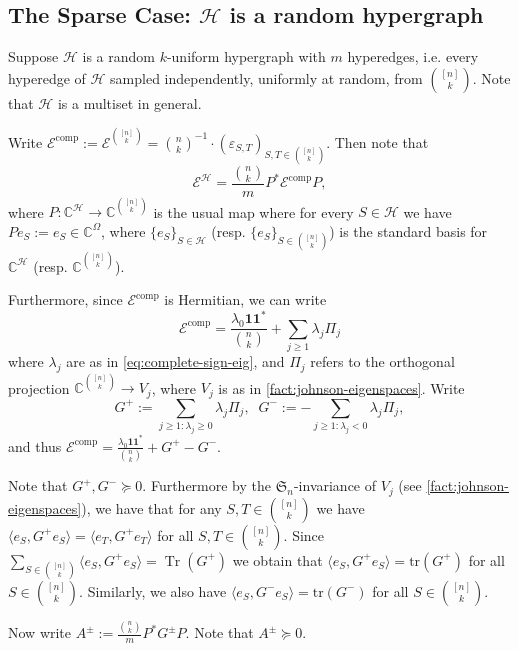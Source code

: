 \documentclass
[11pt,letterpaper]
{article}
\theoremstyle{definition}
\newcommand{\Tr}{\operatorname{Tr}}
\newcommand{\eps}{\varepsilon}
\newcommand{\cE}{{\mathcal E}}
\newcommand{\1}{\mathbf{1}}
\newcommand{\tr}{\mathrm{tr}}
\newcommand{\C}{\mathbb C}
\newcommand{\cH}{\mathcal H}
\renewcommand{\geq}{\geqslant}
\renewcommand{\succeq}{\succcurlyeq}
\newcommand{\comp}{\operatorname{comp}}
\begin{document}
\subsection[The Sparse Case]{The Sparse Case: $\cH$ is a random hypergraph}
Suppose $\cH$ is a random $k$-uniform hypergraph with $m$ hyperedges, i.e. every hyperedge of $\cH$ sampled independently, uniformly at random, from $\binom{[n]}{k}$. Note that $\cH$ is a multiset in general.


Write $\cE^{\comp}:= \cE^{\binom{[n]}{k}} = \binom{n}{k}^{-1}\cdot(\eps_{S, T})_{S, T\in\binom{[n]}{k}}$. Then note that 
\[\cE^\cH = \frac{\binom{n}{k}}{m}P^*\cE^{\comp}P,\]
where $P:\C^\cH\to\C^{\binom{[n]}{k}}$ is the usual map where for every $S\in\cH$ we have $Pe_{S}:= e_{S}\in\C^\Omega$, where $\{e_S\}_{S\in\cH}$ (resp. $\{e_S\}_{S\in\binom{[n]}{k}}$) is the standard basis for $\C^{\cH}$ (resp. $\C^{\binom{[n]}{k}}$).

Furthermore, since $\cE^{\comp}$ is Hermitian, we can write 
\[\cE^{\comp} = \frac{\lambda_0\1\1^*}{\binom{n}{k}} + \sum_{j\geq 1}\lambda_j\Pi_j\]
where $\lambda_j$ are as in \cref{eq:complete-sign-eig}, and $\Pi_j$ refers to the orthogonal projection $\C^{\binom{[n]}{k}}\to V_j$, where $V_j$ is as in \cref{fact:johnson-eigenspaces}. Write 
\[G^+:= \sum_{j\geq 1:\lambda_j\geq 0}\lambda_j\Pi_j,\;\;G^{-}:= -\sum_{j\geq 1:\lambda_j < 0}\lambda_j\Pi_j,\]
and thus $\cE^{\comp} = \frac{\lambda_0\1\1^*}{\binom{n}{k}} + G^+ - G^-$. 

Note that $G^+, G^-\succeq 0$. Furthermore by the $\mathfrak{S}_n$-invariance of $V_j$ (see \cref{fact:johnson-eigenspaces}), we have that for any $S, T\in\binom{[n]}{k}$ we have $\langle e_S, G^+ e_S\rangle = \langle e_T, G^+ e_T\rangle$ for all $S, T\in\binom{[n]}{k}$. Since $\sum_{S\in\binom{[n]}{k}}\langle e_S, G^+ e_S\rangle = \Tr(G^+)$ we obtain that $\langle e_S, G^+ e_S\rangle = \tr(G^+)$ for all $S\in\binom{[n]}{k}$. Similarly, we also have $\langle e_S, G^- e_S\rangle = \tr(G^-)$ for all $S\in\binom{[n]}{k}$.

Now write $A^{\pm}:= \frac{\binom{n}{k}}{m}P^*G^{\pm}P$. Note that $A^\pm\succeq 0$.
\end{document}
